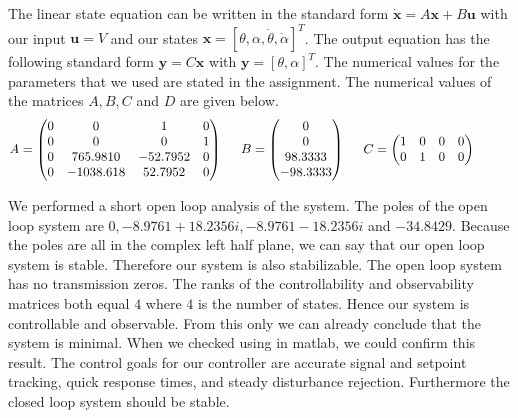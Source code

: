 \documentclass[ twoside,openright,titlepage,numbers=noenddot,headinclude,%
                footinclude=true,cleardoublepage=empty,abstractoff, %
                BCOR=5mm,paper=a4,fontsize=11pt,%
                ngerman,american,%
                ]{scrreprt}
\begin{document}
The linear state equation can be written in the standard form $\mathbf{\dot{x}} = A \mathbf{x} + B \mathbf{u}$ with our input $\mathbf{u} = V$ and our states $\mathbf{x} = [\theta, \alpha ,\dot{\theta}, \dot{\alpha}]^T$. The output equation has the following standard form $\mathbf{y} = C \mathbf{x}$ with $\mathbf{y} = [\theta, \alpha]^T$. The numerical values for the parameters that we used are stated in the assignment. The numerical values of the matrices $A,B,C$ and $D$ are given below.
\begin{equation}
A = 
\begin{pmatrix}
  0 & 0 & 1 & 0 \\
  0 & 0 & 0 & 1 \\
  0  & 765.9810  & -52.7952 & 0 \\
  0 & -1038.618 & 52.7952 & 0
\end{pmatrix} \hspace{0.5cm}
B = 
\begin{pmatrix}
  0 \\
  0 \\
  98.3333 \\
  -98.3333
\end{pmatrix} \hspace{0.5cm}
C = 
\begin{pmatrix}
  1 & 0 & 0 & 0 \\
  0 & 1 & 0 & 0 
\end{pmatrix} \hspace{1cm}
\end{equation}

We performed a short open loop analysis of the system. The poles of the open loop system are $0,-8.9761+18.2356i,-8.9761-18.2356i$ and $-34.8429$. Because the poles are all in the complex left half plane, we can say that our open loop system is stable. Therefore our system is also stabilizable. The open loop system has no transmission zeros. The ranks of the controllability and observability matrices both equal $4$ where $4$ is the number of states. Hence our system is controllable and observable. From this only we can already conclude that the system is minimal. When we checked using in matlab, we could confirm this result. 
\newline
\newline
The control goals for our controller are accurate signal and setpoint tracking, quick response times, and steady disturbance rejection. Furthermore the closed loop system should be stable.
\end{document}
